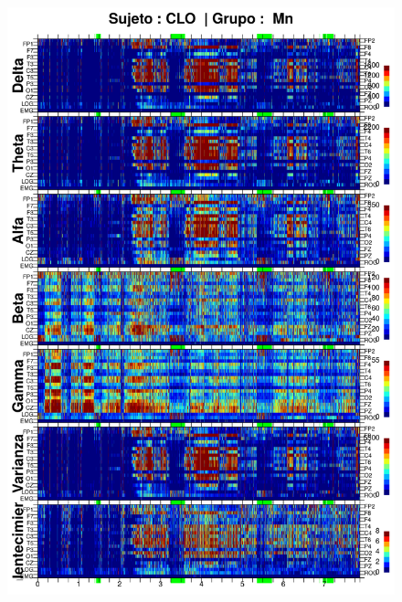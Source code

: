 \begin{figure}
\centering
\includegraphics[width=0.9\linewidth]
{./enlentecimiento/CLMN10SUE_espectral_total.png} 
\end{figure}

